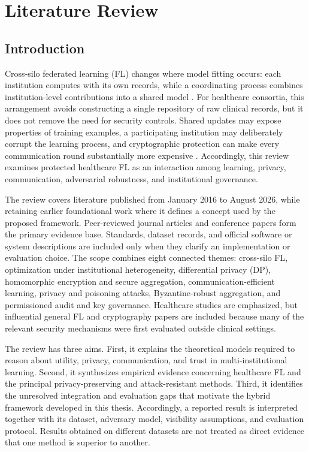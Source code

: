 \chapter{Literature Review}
\label{chap:literature-review}

\section{Introduction}
\label{sec:lr-introduction}

Cross-silo federated learning (FL) changes where model fitting occurs: each institution computes with its own records, while a coordinating process combines institution-level contributions into a shared model \cite{mcmahan2017fedavg}. For healthcare consortia, this arrangement avoids constructing a single repository of raw clinical records, but it does not remove the need for security controls. Shared updates may expose properties of training examples, a participating institution may deliberately corrupt the learning process, and cryptographic protection can make every communication round substantially more expensive \cite{shokri2017membership,zhu2019dlg,bagdasaryan2020backdoor}. Accordingly, this review examines protected healthcare FL as an interaction among learning, privacy, communication, adversarial robustness, and institutional governance.

The review covers literature published from January 2016 to August 2026, while retaining earlier foundational work where it defines a concept used by the proposed framework. Peer-reviewed journal articles and conference papers form the primary evidence base. Standards, dataset records, and official software or system descriptions are included only when they clarify an implementation or evaluation choice. The scope combines eight connected themes: cross-silo FL, optimization under institutional heterogeneity, differential privacy (DP), homomorphic encryption and secure aggregation, communication-efficient learning, privacy and poisoning attacks, Byzantine-robust aggregation, and permissioned audit and key governance. Healthcare studies are emphasized, but influential general FL and cryptography papers are included because many of the relevant security mechanisms were first evaluated outside clinical settings.

The review has three aims. First, it explains the theoretical models required to reason about utility, privacy, communication, and trust in multi-institutional learning. Second, it synthesizes empirical evidence concerning healthcare FL and the principal privacy-preserving and attack-resistant methods. Third, it identifies the unresolved integration and evaluation gaps that motivate the hybrid framework developed in this thesis. Accordingly, a reported result is interpreted together with its dataset, adversary model, visibility assumptions, and evaluation protocol. Results obtained on different datasets are not treated as direct evidence that one method is superior to another.


